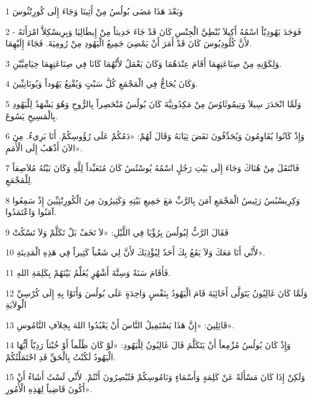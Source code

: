\par 1 وَبَعْدَ هَذَا مَضَى بُولُسُ مِنْ أَثِينَا وَجَاءَ إِلَى كُورِنْثُوسَ
\par 2 فَوَجَدَ يَهُودِيّاً اسْمُهُ أَكِيلاَ بُنْطِيَّ الْجِنْسِ كَانَ قَدْ جَاءَ حَدِيثاً مِنْ إِيطَالِيَا وَبِرِيسْكِلاَّ امْرَأَتَهُ - لأَنَّ كُلُودِيُوسَ كَانَ قَدْ أَمَرَ أَنْ يَمْضِيَ جَمِيعُ الْيَهُودِ مِنْ رُومِيَةَ. فَجَاءَ إِلَيْهِمَا.
\par 3 وَلِكَوْنِهِ مِنْ صِنَاعَتِهِمَا أَقَامَ عِنْدَهُمَا وَكَانَ يَعْمَلُ لأَنَّهُمَا كَانَا فِي صِنَاعَتِهِمَا خِيَامِيَّيْنِ.
\par 4 وَكَانَ يُحَاجُّ فِي الْمَجْمَعِ كُلَّ سَبْتٍ وَيُقْنِعُ يَهُوداً وَيُونَانِيِّينَ.
\par 5 وَلَمَّا انْحَدَرَ سِيلاَ وَتِيمُوثَاوُسُ مِنْ مَكِدُونِيَّةَ كَانَ بُولُسُ مُنْحَصِراً بِالرُّوحِ وَهُوَ يَشْهَدُ لِلْيَهُودِ بِالْمَسِيحِ يَسُوعَ.
\par 6 وَإِذْ كَانُوا يُقَاوِمُونَ وَيُجَدِّفُونَ نَفَضَ ثِيَابَهُ وَقَالَ لَهُمْ: «دَمُكُمْ عَلَى رُؤُوسِكُمْ. أَنَا بَرِيءٌ. مِنَ الآنَ أَذْهَبُ إِلَى الْأُمَمِ».
\par 7 فَانْتَقَلَ مِنْ هُنَاكَ وَجَاءَ إِلَى بَيْتِ رَجُلٍ اسْمُهُ يُوسْتُسُ كَانَ مُتَعَبِّداً لِلَّهِ وَكَانَ بَيْتُهُ مُلاَصِقاً لِلْمَجْمَعِ.
\par 8 وَكِرِيسْبُسُ رَئِيسُ الْمَجْمَعِ آمَنَ بِالرَّبِّ مَعَ جَمِيعِ بَيْتِهِ وَكَثِيرُونَ مِنَ الْكُورِنْثِيِّينَ إِذْ سَمِعُوا آمَنُوا وَاعْتَمَدُوا.
\par 9 فَقَالَ الرَّبُّ لِبُولُسَ بِرُؤْيَا فِي اللَّيْلِ: «لاَ تَخَفْ بَلْ تَكَلَّمْ وَلاَ تَسْكُتْ
\par 10 لأَنِّي أَنَا مَعَكَ وَلاَ يَقَعُ بِكَ أَحَدٌ لِيُؤْذِيَكَ لأَنَّ لِي شَعْباً كَثِيراً فِي هَذِهِ الْمَدِينَةِ».
\par 11 فَأَقَامَ سَنَةً وَسِتَّةَ أَشْهُرٍ يُعَلِّمُ بَيْنَهُمْ بِكَلِمَةِ اللهِ.
\par 12 وَلَمَّا كَانَ غَالِيُونُ يَتَوَلَّى أَخَائِيَةَ قَامَ الْيَهُودُ بِنَفْسٍ وَاحِدَةٍ عَلَى بُولُسَ وَأَتَوْا بِهِ إِلَى كُرْسِيِّ الْوِلاَيَةِ
\par 13 قَائِلِينَ: «إِنَّ هَذَا يَسْتَمِيلُ النَّاسَ أَنْ يَعْبُدُوا اللهَ بِخِلاَفِ النَّامُوسِ».
\par 14 وَإِذْ كَانَ بُولُسُ مُزْمِعاً أَنْ يَتَكَلَّمَ قَالَ غَالِيُونُ لِلْيَهُودِ: «لَوْ كَانَ ظُلْماً أَوْ خُبْثاً رَدِيّاً أَيُّهَا الْيَهُودُ لَكُنْتُ بِالْحَقِّ قَدِ احْتَمَلْتُكُمْ.
\par 15 وَلَكِنْ إِذَا كَانَ مَسْأَلَةً عَنْ كَلِمَةٍ وَأَسْمَاءٍ وَنَامُوسِكُمْ فَتُبْصِرُونَ أَنْتُمْ. لأَنِّي لَسْتُ أَشَاءُ أَنْ أَكُونَ قَاضِياً لِهَذِهِ الْأُمُورِ».
